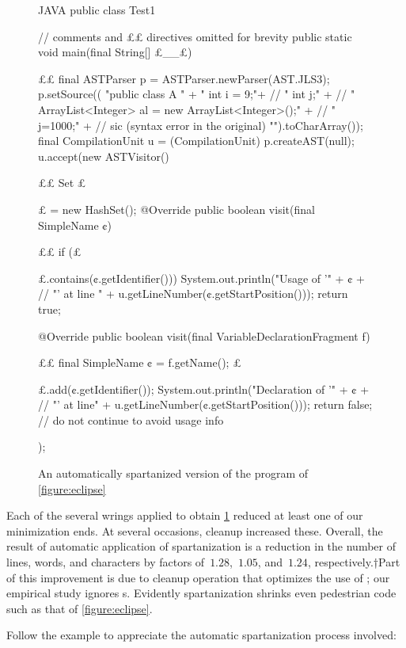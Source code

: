 \begin{figure}
  \caption{An automatically spartanized version of
      the \Java program of \cref{figure:eclipse}}
    \label{figure:eclipse:automatic}
    \begin{adjustbox}{max width=\columnwidth}
\begin{code}[minipage, width=1.20\columnwidth]{JAVA}
public class Test1 { // comments and ££ directives omitted for brevity
  public static void main(final String[] £\_\_£) {££
    final ASTParser p = ASTParser.newParser(AST.JLS3);
    p.setSource((
      "public class A {\n" +
      " int i = 9;\n"+ //
      " int j;\n" + //
      " ArrayList<Integer> al = new ArrayList<Integer>();\n" + //
      " j=1000;\n" + // sic (syntax error in the original)
      "}\n").toCharArray());
    final CompilationUnit u = (CompilationUnit) p.createAST(null);
    u.accept(new ASTVisitor() {££
      Set £\ignore$£$ = new HashSet();
      @Override public boolean visit(final SimpleName ¢) {££
        if (£\ignore$£$.contains(¢.getIdentifier()))
          System.out.println("Usage of '" + ¢ + //
            "' at line " + u.getLineNumber(¢.getStartPosition()));
        return true;
      }
      @Override public boolean visit(final VariableDeclarationFragment f) {££
        final SimpleName ¢ = f.getName();
        £\ignore$£$.add(¢.getIdentifier());
        System.out.println("Declaration of '" + ¢ + //
          "' at line" + u.getLineNumber(¢.getStartPosition()));
        return false; // do not continue to avoid usage info
      }
    });
  }
}
\end{code}
  \end{adjustbox}
\end{figure}
Each of the several wrings applied to obtain \cref{figure:eclipse:automatic}
  reduced at least one of our minimization ends.
At several occasions, cleanup increased these.
Overall, the result of automatic application of spartanization
  is a reduction in the number of lines, words, and characters
  by factors of~$1.28$,~$1.05$, and~$1.24$, respectively.†{Part of this improvement
    is due to cleanup operation that optimizes the use of ; our empirical
  study ignores s.}
Evidently spartanization shrinks even pedestrian code such as that of
\cref{figure:eclipse}.

Follow the example to appreciate the automatic spartanization process involved:

